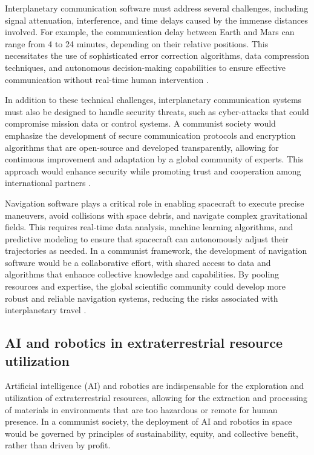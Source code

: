 Interplanetary communication software must address several challenges, including signal attenuation, interference, and time delays caused by the immense distances involved. For example, the communication delay between Earth and Mars can range from 4 to 24 minutes, depending on their relative positions. This necessitates the use of sophisticated error correction algorithms, data compression techniques, and autonomous decision-making capabilities to ensure effective communication without real-time human intervention \cite[pp.~210-213]{nasa2020}.

In addition to these technical challenges, interplanetary communication systems must also be designed to handle security threats, such as cyber-attacks that could compromise mission data or control systems. A communist society would emphasize the development of secure communication protocols and encryption algorithms that are open-source and developed transparently, allowing for continuous improvement and adaptation by a global community of experts. This approach would enhance security while promoting trust and cooperation among international partners \cite[pp.~320-322]{sagan1979}.

Navigation software plays a critical role in enabling spacecraft to execute precise maneuvers, avoid collisions with space debris, and navigate complex gravitational fields. This requires real-time data analysis, machine learning algorithms, and predictive modeling to ensure that spacecraft can autonomously adjust their trajectories as needed. In a communist framework, the development of navigation software would be a collaborative effort, with shared access to data and algorithms that enhance collective knowledge and capabilities. By pooling resources and expertise, the global scientific community could develop more robust and reliable navigation systems, reducing the risks associated with interplanetary travel \cite[pp.~78-81]{bookchin1986}.

\subsection{AI and robotics in extraterrestrial resource utilization}

Artificial intelligence (AI) and robotics are indispensable for the exploration and utilization of extraterrestrial resources, allowing for the extraction and processing of materials in environments that are too hazardous or remote for human presence. In a communist society, the deployment of AI and robotics in space would be governed by principles of sustainability, equity, and collective benefit, rather than driven by profit.


